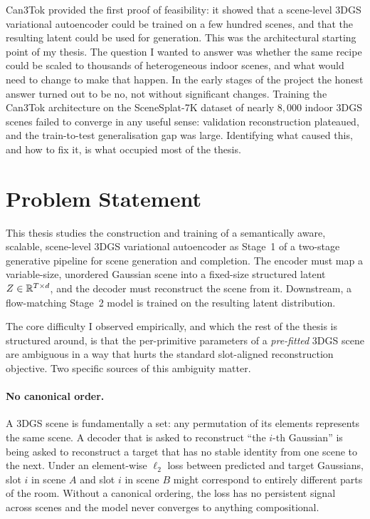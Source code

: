 Can3Tok \citep{gao2025can3tok} provided the first proof of feasibility: it showed that a scene-level 3DGS variational autoencoder could be trained on a few hundred scenes, and that the resulting latent could be used for generation. This was the architectural starting point of my thesis. The question I wanted to answer was whether the same recipe could be scaled to thousands of heterogeneous indoor scenes, and what would need to change to make that happen. In the early stages of the project the honest answer turned out to be no, not without significant changes. Training the Can3Tok architecture on the SceneSplat-7K dataset \citep{li2025scenesplat} of nearly $8{,}000$ indoor 3DGS scenes failed to converge in any useful sense: validation reconstruction plateaued, and the train-to-test generalisation gap was large. Identifying what caused this, and how to fix it, is what occupied most of the thesis.

\section{Problem Statement}
\label{sec:intro_problem}

This thesis studies the construction and training of a semantically aware, scalable, scene-level 3DGS variational autoencoder as Stage~1 of a two-stage generative pipeline for scene generation and completion. The encoder must map a variable-size, unordered Gaussian scene into a fixed-size structured latent $Z \in \mathbb{R}^{T \times d}$, and the decoder must reconstruct the scene from it. Downstream, a flow-matching Stage~2 model is trained on the resulting latent distribution.

The core difficulty I observed empirically, and which the rest of the thesis is structured around, is that the per-primitive parameters of a \emph{pre-fitted} 3DGS scene are ambiguous in a way that hurts the standard slot-aligned reconstruction objective. Two specific sources of this ambiguity matter.

\paragraph{No canonical order.} A 3DGS scene is fundamentally a set: any permutation of its elements represents the same scene. A decoder that is asked to reconstruct ``the $i$-th Gaussian'' is being asked to reconstruct a target that has no stable identity from one scene to the next. Under an element-wise $\ell_2$ loss between predicted and target Gaussians, slot $i$ in scene $A$ and slot $i$ in scene $B$ might correspond to entirely different parts of the room. Without a canonical ordering, the loss has no persistent signal across scenes and the model never converges to anything compositional.

